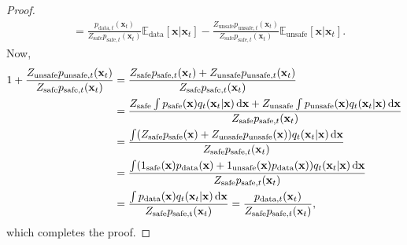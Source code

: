 \begin{proof}
\begin{align*}
    &=\frac{p_{\text{data},t}(\mathbf{x}_{t})}{Z_{\text{safe}}p_{\text{safe},t}(\mathbf{x}_{t})}\mathbb{E}_{\text{data}}[\mathbf{x}\vert\mathbf{x}_{t}]-\frac{Z_{\text{unsafe}}p_{\text{unsafe},t}(\mathbf{x}_{t})}{Z_{\text{safe}}p_{\text{safe},t}(\mathbf{x}_{t})}\mathbb{E}_{\text{unsafe}}[\mathbf{x}\vert\mathbf{x}_{t}].
\end{align*}
Now, 
\begin{align*}
    1+\frac{Z_{\text{unsafe}}p_{\text{unsafe},t}(\mathbf{x}_{t})}{Z_{\text{safe}}p_{\text{safe},t}(\mathbf{x}_{t})}&=\frac{Z_{\text{safe}}p_{\text{safe},t}(\mathbf{x}_{t})+Z_{\text{unsafe}}p_{\text{unsafe},t}(\mathbf{x}_{t})}{Z_{\text{safe}}p_{\text{safe},t}(\mathbf{x}_{t})}\\
    &=\frac{Z_{\text{safe}}\int p_{\text{safe}}(\mathbf{x})q_{t}(\mathbf{x}_{t}\vert\mathbf{x})\mathop{}\!\mathrm{d}\mathbf{x}+Z_{\text{unsafe}}\int p_{\text{unsafe}}(\mathbf{x})q_{t}(\mathbf{x}_{t}\vert\mathbf{x})\mathop{}\!\mathrm{d}\mathbf{x}}{Z_{\text{safe}}p_{\text{safe},t}(\mathbf{x}_{t})}\\
    &=\frac{\int (Z_{\text{safe}}p_{\text{safe}}(\mathbf{x})+Z_{\text{unsafe}}p_{\text{unsafe}}(\mathbf{x}))q_{t}(\mathbf{x}_{t}\vert\mathbf{x})\mathop{}\!\mathrm{d}\mathbf{x}}{Z_{\text{safe}}p_{\text{safe},t}(\mathbf{x}_{t})}\\
    &=\frac{\int (1_{\text{safe}}(\mathbf{x})p_{\text{data}}(\mathbf{x})+1_{\text{unsafe}}(\mathbf{x})p_{\text{data}}(\mathbf{x}))q_{t}(\mathbf{x}_{t}\vert\mathbf{x})\mathop{}\!\mathrm{d}\mathbf{x}}{Z_{\text{safe}}p_{\text{safe},t}(\mathbf{x}_{t})}\\
    &=\frac{\int p_{\text{data}}(\mathbf{x})q_{t}(\mathbf{x}_{t}\vert\mathbf{x})\mathop{}\!\mathrm{d}\mathbf{x}}{Z_{\text{safe}}p_{\text{safe,t}}(\mathbf{x}_{t})}=\frac{p_{\text{data},t}(\mathbf{x}_{t})}{Z_{\text{safe}}p_{\text{safe},t}(\mathbf{x}_{t})},
\end{align*}
which completes the proof.
\end{proof}

%
%
%
%
%
%
%
%
%
%
%

%
%
%
%
%
%
%
%
%
%
%
%
%
%
%
%
%